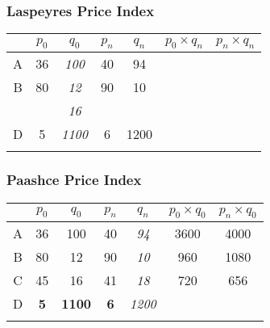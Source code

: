 \documentclass{beamer}
\begin{document}
\begin{frame}
\frametitle{Laspeyres Price Index}

\begin{center}
\LARGE
\begin{tabular}{|c||c|c||c|c||c|c|}
\hline  &\phantom{s}$p_0$\phantom{s}	&	$q_0$	&	$p_n$	&	$q_n$	&	$p_0 \times q_n$	&	$p_n \times q_n$	\\	\hline \hline
A & 36	&	\textit{100}	&	40	&	94	&	\phantom{960}	&	\phantom{1080}	\\	\hline
B & 80	&	\textit{12}	&	90	&	10	&	\phantom{960}	&	\phantom{1080}	\\	\hline
\textbf{{\color{red}{C}}} & \textbf{{\color{red}{45}}}	&	\textit{16}	&	\textbf{{\color{red}{41}}}	&	\textbf{{\color{red}{18}}}	&	\phantom{720}	&	\phantom{656}	\\	\hline
D & 5	&	\textit{1100}	&	6	&	1200	&	\phantom{5500}	&	\phantom{6600}	\\	\hline \hline
& 	&		&		&		&	\phantom{10780}	&	\phantom{12336}	\\	\hline
\end{tabular} 
\end{center}
\end{frame}
\begin{frame}
\frametitle{Paashce Price Index}
\begin{center}
\LARGE
\begin{tabular}{|c||c|c||c|c||c|c|}
\hline  &\phantom{s}$p_0$\phantom{s}	&	$q_0$	&	$p_n$	&	$q_n$	&	$p_0 \times q_0$	&	$p_n \times q_0$	\\	\hline
A & 36	&	100	&	40	&	\textit{94}	&	3600	&	4000	\\	\hline
B & 80	&	12	&	90	&	\textit{10}	&	960	&	1080	\\	\hline
C & 45	&	16	&	41	&	\textit{18}	&	720	&	656	\\	\hline
D & \textbf{5}	&\textbf{	1100}	&	\textbf{6}	&	\textit{1200}	&	\textbf{{\color{red}{5500}}}	&	\textbf{{\color{red}{6600}}}	\\	\hline
& 	&		&		&		&	\phantom{10780}	&	\phantom{12336}	\\	\hline
\end{tabular} 
\end{center}
\end{frame}
\end{document}
